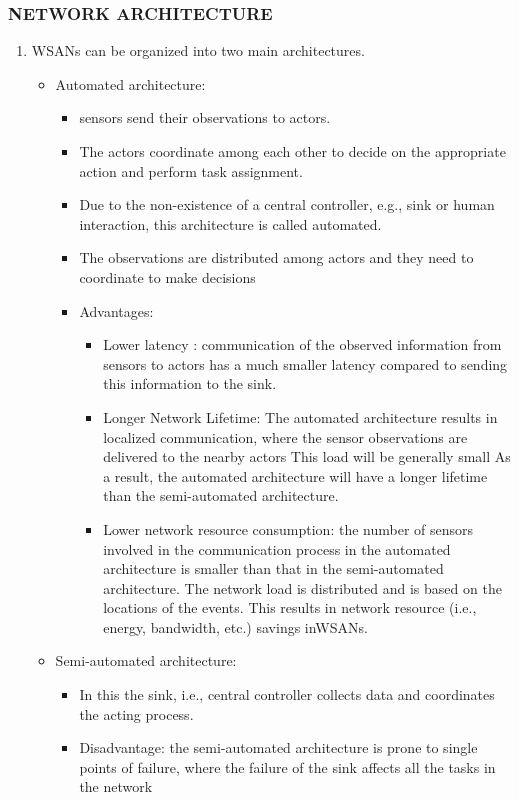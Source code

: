 \documentclass[11pt]{class}
\begin{document}
								\begin{frame}
								\frametitle{NETWORK ARCHITECTURE}
								\begin{enumerate}
									\item WSANs can be organized into two main architectures. 
								\begin{itemize}
									\item Automated architecture:
									\begin{itemize}
										\item  sensors send their observations to actors.
										\item  The actors coordinate among each other to decide on the appropriate action and perform task assignment.
										\item  Due to the non-existence of a central controller, e.g., sink or human interaction, this architecture is called automated.
										\item  The observations are distributed among actors and they need to coordinate to make decisions
							            \item Advantages: 
							            \begin{itemize}
							            	\item Lower latency : communication of the observed information from sensors to actors has a much smaller latency compared to sending this information to the sink.
							            	\item Longer Network Lifetime: The automated architecture results in localized communication, where the sensor observations are delivered to the nearby actors
							            	This load will be generally small
							            	As a result, the automated architecture will have a longer lifetime than the semi-automated
							            	architecture.
							            	\item Lower network resource consumption: the number of sensors involved in the communication process in the automated architecture is smaller than that in the semi-automated architecture.
							            	 The network load is distributed and is based on the locations of the events.
							            	  This results in network resource (i.e., energy, bandwidth, etc.) savings inWSANs.
							            \end{itemize}
								\end{itemize}
								\item Semi-automated architecture: 
								\begin{itemize}
									\item In this the sink, i.e., central controller collects data and
									coordinates the acting process.
									\item Disadvantage: the semi-automated architecture is prone to single points of failure, where the failure of the sink affects all the tasks in the network
								\end{itemize} 
							\end{itemize}
						\end{enumerate}
							\end{frame}
\end{document}
